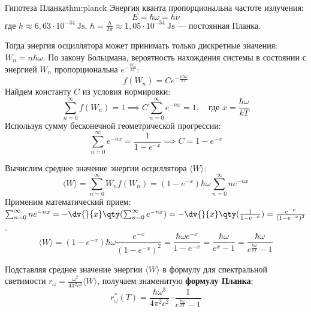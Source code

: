 \begin{theorem}{Гипотеза Планка}{thm:planck}
	Энергия кванта пропорциональна частоте излучения:
	\begin{equation}
		E = \hbar\omega = h\nu
	\end{equation}
	где $h \approx 6{,}63 \cdot 10^{-34} \ \si{\joule\second}$, $\hbar = \frac{h}{2\pi} \approx 1{,}05 \cdot 10^{-34} \ \si{\joule\second}$ --- постоянная Планка.
\end{theorem}

Тогда энергия осциллятора может принимать только дискретные значения: $W_n = n\hbar\omega$. По закону Больцмана, вероятность нахождения системы в состоянии с энергией $W_n$ пропорциональна $e^{-\frac{W_n}{kT}}$:
\begin{equation}
	f(W_n) = C e^{-\frac{n\hbar\omega}{kT}}
\end{equation}
Найдем константу $C$ из условия нормировки:
\begin{equation}
	\sum_{n=0}^{\infty} f(W_n) = 1 \implies C \sum_{n=0}^{\infty} e^{-n x} = 1, \quad \text{где } x = \frac{\hbar\omega}{kT}
\end{equation}
Используя сумму бесконечной геометрической прогрессии:
\begin{equation}
	\sum_{n=0}^{\infty} e^{-nx} = \frac{1}{1 - e^{-x}} \implies C = 1 - e^{-x}
\end{equation}

Вычислим среднее значение энергии осциллятора $\langle W \rangle$:
\begin{equation}
	\langle W \rangle = \sum_{n=0}^{\infty} W_n f(W_n) = (1 - e^{-x}) \hbar\omega \sum_{n=0}^{\infty} n e^{-nx}
\end{equation}
Применим математический прием: $\sum_{n=0}^{\infty} n e^{-nx} = -\dv{}{x} \qty(\sum_{n=0}^{\infty} e^{-nx}) = -\dv{}{x} \qty(\frac{1}{1-e^{-x}}) = \frac{e^{-x}}{(1-e^{-x})^2}$.
\begin{equation}
	\langle W \rangle = (1 - e^{-x}) \hbar\omega \frac{e^{-x}}{(1-e^{-x})^2} = \frac{\hbar\omega e^{-x}}{1 - e^{-x}} = \frac{\hbar\omega}{e^x - 1} = \frac{\hbar\omega}{e^{\frac{\hbar\omega}{kT}} - 1}
\end{equation}

Подставляя среднее значение энергии $\langle W \rangle$ в формулу для спектральной светимости $r_\omega = \frac{\omega^2}{4\pi^2 c^2} \langle W \rangle$, получаем знаменитую \textbf{формулу Планка}:
\begin{equation}
	r_\omega^*(T) = \frac{\hbar\omega^3}{4\pi^2 c^2} \cdot \frac{1}{e^{\frac{\hbar\omega}{kT}} - 1}
\end{equation}

